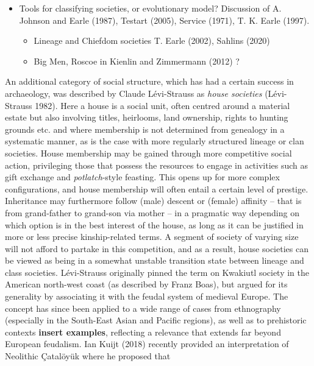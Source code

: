 \documentclass[
  12pt,
  a4paper, twoside]{book}
\providecommand{\tightlist}{%
  \setlength{\itemsep}{0pt}\setlength{\parskip}{0pt}}
\begin{document}
\begin{itemize}
\item
  Tools for classifying societies, or evolutionary model? Discussion of A. Johnson and Earle (1987), Testart (2005), Service (1971), T. K. Earle (1997).

  \begin{itemize}
  \tightlist
  \item
    Lineage and Chiefdom societies T. Earle (2002), Sahlins (2020)
  \item
    Big Men, Roscoe in Kienlin and Zimmermann (2012) ?
  \end{itemize}
\end{itemize}

An additional category of social structure, which has had a certain success in archaeology, was described by Claude Lévi-Strauss as \emph{house societies} (Lévi-Strauss 1982). Here a house is a social unit, often centred around a material estate but also involving titles, heirlooms, land ownership, rights to hunting grounds etc. and where membership is not determined from genealogy in a systematic manner, as is the case with more regularly structured lineage or clan societies. House membership may be gained through more competitive social action, privileging those that possess the resources to engage in activities such as gift exchange and \emph{potlatch}-style feasting. This opens up for more complex configurations, and house membership will often entail a certain level of prestige. Inheritance may furthermore follow (male) descent or (female) affinity -- that is from grand-father to grand-son via mother -- in a pragmatic way depending on which option is in the best interest of the house, as long as it can be justified in more or less precise kinship-related terms. A segment of society of varying size will not afford to partake in this competition, and as a result, house societies can be viewed as being in a somewhat unstable transition state between lineage and class societies. Lévi-Strauss originally pinned the term on Kwakiutl society in the American north-west coast (as described by Franz Boas), but argued for its generality by associating it with the feudal system of medieval Europe. The concept has since been applied to a wide range of cases from ethnography (especially in the South-East Asian and Pacific regions), as well as to prehistoric contexts \textbf{insert examples}, reflecting a relevance that extends far beyond European feudalism. Ian Kuijt (2018) recently provided an interpretation of Neolithic Çatalöyük where he proposed that
\end{document}
